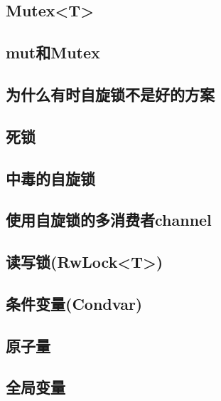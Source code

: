 \subsection{Mutex<T>}\label{mutex}

\subsection{mut和Mutex}

\subsection{为什么有时自旋锁不是好的方案}

\subsection{死锁}

\subsection{中毒的自旋锁}

\subsection{使用自旋锁的多消费者channel}

\subsection{读写锁(RwLock<T>)}

\subsection{条件变量(Condvar)}

\subsection{原子量}\label{atomic}

\subsection{全局变量}\label{globalvar}